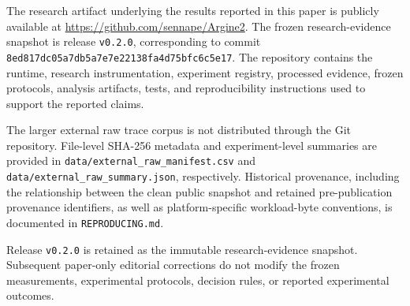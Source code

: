 \documentclass[11pt]{article}
\begin{document}
The research artifact underlying the results reported in this paper is publicly available at \url{https://github.com/sennape/Argine2}. The frozen research-evidence snapshot is release \texttt{v0.2.0}, corresponding to commit \texttt{8ed817dc05a7db5a7e7e22138fa4d75bfc6c5e17}. The repository contains the runtime, research instrumentation, experiment registry, processed evidence, frozen protocols, analysis artifacts, tests, and reproducibility instructions used to support the reported claims.

The larger external raw trace corpus is not distributed through the Git repository. File-level SHA-256 metadata and experiment-level summaries are provided in \texttt{data/external\_raw\_manifest.csv} and \texttt{data/external\_raw\_summary.json}, respectively. Historical provenance, including the relationship between the clean public snapshot and retained pre-publication provenance identifiers, as well as platform-specific workload-byte conventions, is documented in \texttt{REPRODUCING.md}.

Release \texttt{v0.2.0} is retained as the immutable research-evidence snapshot. Subsequent paper-only editorial corrections do not modify the frozen measurements, experimental protocols, decision rules, or reported experimental outcomes.



\end{document}
